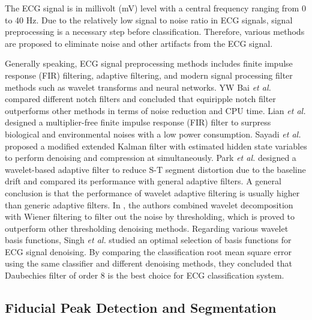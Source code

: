 The ECG signal is in millivolt (mV) level with a central frequency ranging from 0 to 40 Hz\cite{thakor1984estimation}. %
Due to the relatively low signal to noise ratio in ECG signals, signal preprocessing is a necessary step before classification. Therefore, various methods are proposed to eliminate noise and other artifacts from the ECG signal\cite{lian2004ecg,thakor1984estimation,bai2004adjustable,Sayadi,park1998application, nikolaev2000wavelet, denoise,poungponsri2013adaptive}.%

Generally speaking, ECG signal preprocessing methods includes finite impulse response (FIR) filtering, adaptive filtering, and modern signal processing filter methods such as wavelet transforms and neural networks\cite{bai2004adjustable,Sayadi,denoise,poungponsri2013adaptive}. YW Bai \textit{et al.} compared different notch filters and concluded that equiripple notch filter outperforms other methods in terms of noise reduction and CPU time\cite{bai2004adjustable}. Lian \textit{et al.} \cite{lian2004ecg} designed a multiplier-free finite impulse response (FIR) filter to surpress biological and environmental noises with a low power consumption. Sayadi \textit{et al.} proposed a modified extended Kalman filter with estimated hidden state variables to perform denoising and compression at simultaneously\cite{Sayadi}. Park \textit{et al.} designed a wavelet-based adaptive filter to reduce S-T segment distortion due to the baseline drift and compared its performance with general adaptive filters\cite{park1998application}. A general conclusion is that the performance of wavelet adaptive filtering is usually higher than generic adaptive filters. In \cite{nikolaev2000wavelet}, the authors combined wavelet decomposition with Wiener filtering to filter out the noise by thresholding, which is proved to outperform other thresholding denoising methods. Regarding various wavelet basis functions, Singh \textit{et al.} studied an optimal selection of basis functions for ECG signal denoising\cite{denoise}. By comparing the classification root mean square error using the same classifier and different denoising methods, they concluded that Daubechies filter of order 8 is the best choice for ECG classification system.


\subsection{Fiducial Peak Detection and Segmentation}\label{sec:fiducial_peaks}

